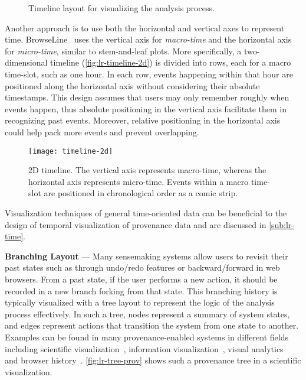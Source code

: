 \begin{figure}[!htb]
\centering
{}

\vspace{.5\baselineskip}

\caption{Timeline layout for visualizing the analysis process.}
\end{figure}

Another approach is to use both the horizontal and vertical axes to represent time. BrowseLine~\cite{Hoeber2009} uses the vertical axis for \emph{macro-time} and the horizontal axis for \emph{micro-time}, similar to stem-and-leaf plots. More specifically, a two-dimensional timeline (\autoref{fig:lr-timeline-2d}) is divided into rows, each for a macro time-slot, such as one hour. In each row, events happening within that hour are positioned along the horizontal axis without considering their absolute timestamps. This design assumes that users may only remember roughly when events happen, thus absolute positioning in the vertical axis facilitate them in recognizing past events. Moreover, relative positioning in the horizontal axis could help pack more events and prevent overlapping. 

\begin{figure}[!htb]
	\centering
	\texttt{[image: timeline-2d]}
	\caption{2D timeline. The vertical axis represents macro-time, whereas the horizontal axis represents micro-time. Events within a macro time-slot are positioned in chronological order as a comic strip. }
	\label{fig:lr-timeline-2d}
\end{figure}

Visualization techniques of general time-oriented data can be beneficial to the design of temporal visualization of provenance data and are discussed in \autoref{sub:lr-time}.

\textbf{Branching Layout} --- Many sensemaking systems allow users to revisit their past states such as through undo/redo features or backward/forward in web browsers. From a past state, if the user performs a new action, it should be recorded in a new branch forking from that state. This branching history is typically visualized with a tree layout to represent the logic of the analysis process effectively. In such a tree, nodes represent a summary of system states, and edges represent actions that transition the system from one state to another. Examples can be found in many provenance-enabled systems in different fields including scientific visualization~\cite{Ma1999}, information visualization~\cite{Dunne2012}, visual analytics~\cite{Kadivar2009} and browser history~\cite{Ayers1995}. \autoref{fig:lr-tree-prov} shows such a provenance tree in a scientific visualization.

